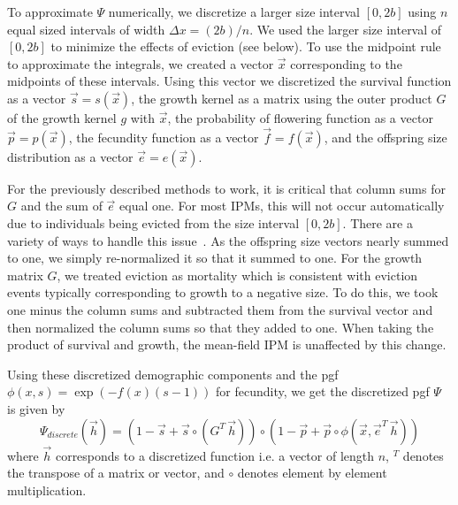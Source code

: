 \documentclass[12pt]{amsart}\usepackage[]{graphicx}\usepackage[]{color}
\makeatletter
\newenvironment{kframe}{%
 \def\at@end@of@kframe{}%
 \ifinner\ifhmode%
  \def\at@end@of@kframe{\end{minipage}}%
  \begin{minipage}{\columnwidth}%
 \fi\fi%
 \def\FrameCommand##1{\hskip\@totalleftmargin \hskip-\fboxsep
 \colorbox{shadecolor}{##1}\hskip-\fboxsep
     \hskip-\linewidth \hskip-\@totalleftmargin \hskip\columnwidth}%
 \MakeFramed {\advance\hsize-\width
   \@totalleftmargin\z@ \linewidth\hsize
   \@setminipage}}%
 {\par\unskip\endMakeFramed%
 \at@end@of@kframe}
\newenvironment{knitrout}{}{} %
\makeatother
\begin{document}
To approximate $\Psi$ numerically, we discretize a larger size interval $[0,2b]$ using $n$ equal sized intervals of width $\Delta x=(2b)/n$. We used the larger size interval of $[0,2b]$ to minimize the effects of eviction (see below). To use the midpoint rule to approximate the integrals, we created a vector $\vec x$ corresponding to the midpoints of these intervals. Using this vector we discretized the survival function as a vector $\vec s=s(\vec x)$, the growth kernel as a matrix using the outer product $G$ of the growth kernel $g$ with $\vec x$, the probability of flowering function as a vector $\vec p=p(\vec x)$, the fecundity function as a vector $\vec f=f(\vec x)$, and the offspring size distribution as a vector $\vec e=e(\vec x)$.

For the previously described methods to work, it is critical that column sums for $G$ and the sum of $\vec e$ equal one. For most IPMs, this will not occur automatically due to individuals being evicted from the size interval $[0,2b]$. There are a variety of ways to handle this issue~\citep{williams-etal-12}. As the  offspring size vectors nearly summed to one, we simply re-normalized it so that it summed to one. For the growth matrix $G$, we treated eviction as mortality which is consistent with eviction events typically corresponding to growth to a negative size. To do this, we took one minus the column sums and subtracted them from the survival vector and then normalized the column sums so that they added to one. When taking the product of survival and growth, the mean-field IPM is unaffected by this change.

Using these discretized demographic components and the pgf $\phi(x,s)=\exp(-f(x)(s-1))$ for fecundity, we get the discretized pgf $\Psi$ is given by
\[
\Psi_{discrete}(\vec h)=(1-\vec s+\vec s\circ (G^T\, \vec h))\circ(1-\vec p+\vec p\circ \phi(\vec x,\vec e^T\,\vec h))
\]
where $\vec h$ corresponds to a discretized function i.e. a vector of length $n$, $^T$ denotes the transpose of a matrix or vector,  and $\circ$ denotes element by element multiplication.


\begin{knitrout}
\color{fgcolor}\begin{kframe}


{\ttfamily\noindent\itshape\color{messagecolor}{\#\# Loading required package: fitdistrplus}}\end{kframe}
\end{knitrout}
\end{document}
